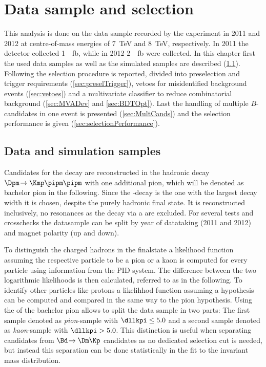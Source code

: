 \chapter{Data sample and selection}

This analysis is done on the data sample recorded by the \lhcb experiment in \num{2011} and \num{2012} at centre-of-mass energies of \SI{7}{\tera\electronvolt} and \SI{8}{\tera\electronvolt}, respectively.
In \num{2011} the detector collected \SI{1}{\per\femto\barn}, while in \num{2012} \SI{2}{\per\femto\barn} were collected.
In this chapter first the used data samples as well as the simulated samples are described (\cref{sec:Samples}).
Following the selection procedure is reported, divided into preselection and trigger requirements (\cref{sec:preselTrigger}), vetoes for \eg misidentified background events (\cref{sec:vetoes}) and a multivariate classifier to reduce combinatorial background (\cref{sec:MVADev} and \cref{sec:BDTOpt}).
Last the handling of multiple $B$-candidates in one event is presented (\cref{sec:MultCands}) and the selection performance is given (\cref{sec:selectionPerformance}).

\section{Data and simulation samples}
\label{sec:Samples}

Candidates for the decay \BdToDpi are reconstructed in the hadronic decay $\Dpm\!\to\Kmp\pipm\pipm$ with one additional pion, which will be denoted as bachelor pion in the following.
Since the \D-decay is the one with the largest decay width it is chosen, despite the purely hadronic final state.
It is reconstructed inclusively, \ie no resonances as the decay via a \Kstarz are excluded.
For several tests and crosschecks the datasample can be split by year of datataking (\num{2011} and \num{2012}) and magnet polarity (up and down).

To distinguish the charged hadrons in the finalstate a likelihood function assuming the respective particle to be a pion or a kaon is computed for every particle using information from the PID system.
The difference between the two logarithmic likelihoods is then calculated, referred to as \dllkpi in the following.
To identify other particles like protons a likelihhod function assuming a hypothesis can be computed and compared in the same way to the pion hypothesis.
Using the \dllkpi of the bachelor pion allows to split the data sample in two parts: The first sample denoted as \emph{pion}-sample with $\dllkpi\leq5.0$ and a second sample denoted as \emph{kaon}-sample with $\dllkpi>5.0$. This distinction is useful when separating \BdToDpi candidates from $\Bd\!\to\Dm\Kp$ candidates as no dedicated selection cut is needed, but instead this separation can be done statistically in the fit to the invariant mass distribution.


